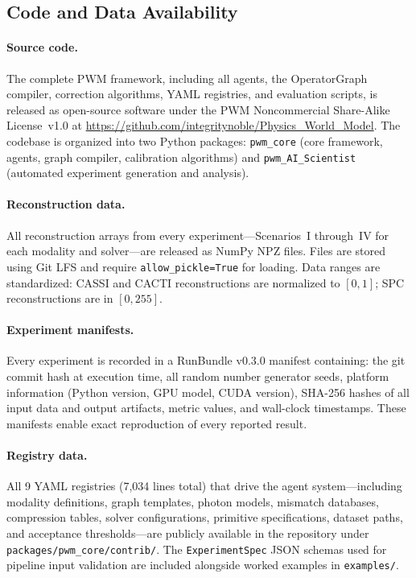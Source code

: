 \documentclass[11pt]{article}
\begin{document}
\subsection*{Code and Data Availability}
\label{sec:methods:availability}

\paragraph{Source code.}
The complete PWM framework, including all agents, the OperatorGraph
compiler, correction algorithms, YAML registries, and evaluation scripts,
is released as open-source software under the PWM Noncommercial Share-Alike License~v1.0 at
\url{https://github.com/integritynoble/Physics_World_Model}.  The
codebase is organized into two Python packages:
\texttt{pwm\_core} (core framework, agents, graph compiler, calibration
algorithms) and \texttt{pwm\_AI\_Scientist} (automated experiment
generation and analysis).

\paragraph{Reconstruction data.}
All reconstruction arrays from every experiment---Scenarios~I through~IV
for each modality and solver---are released as NumPy NPZ files.
Files are stored using Git LFS and require \texttt{allow\_pickle=True}
for loading.  Data ranges are standardized: CASSI and CACTI
reconstructions are normalized to $[0, 1]$; SPC reconstructions are in
$[0, 255]$.

\paragraph{Experiment manifests.}
Every experiment is recorded in a RunBundle v0.3.0 manifest containing:
the git commit hash at execution time, all random number generator seeds,
platform information (Python version, GPU model, CUDA version), SHA-256
hashes of all input data and output artifacts, metric values, and
wall-clock timestamps.  These manifests enable exact reproduction of every
reported result.

\paragraph{Registry data.}
All 9 YAML registries (7,034 lines total) that drive the agent system---including
modality definitions, graph templates, photon models, mismatch databases,
compression tables, solver configurations, primitive specifications,
dataset paths, and acceptance thresholds---are publicly available in the
repository under \texttt{packages/pwm\_core/contrib/}.
The \texttt{ExperimentSpec} JSON schemas used for pipeline input
validation are included alongside worked examples in
\texttt{examples/}.
\end{document}
